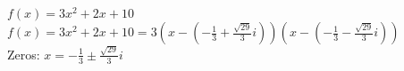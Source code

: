 {$f(x) = 3x^{2} + 2x + 10$}
{$f(x) = 3x^2 + 2x +10 = 3\left(x-\left(-\frac{1}{3} + \frac{\sqrt{29}}{3} i\right) \right) \left(x-\left(-\frac{1}{3} - \frac{\sqrt{29}}{3} i\right) \right)$\\
Zeros:  $x = -\frac{1}{3} \pm \frac{\sqrt{29}}{3} i$}